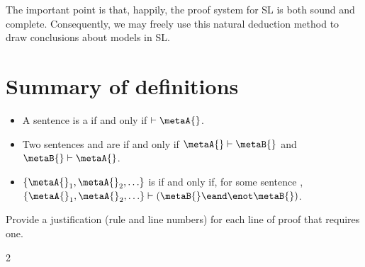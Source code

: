 The important point is that, happily, the proof system for SL is both sound and complete. Consequently, we may freely use this natural deduction method to draw conclusions about models in SL.


\section*{Summary of definitions}
\begin{itemize}
\item A sentence \metaA{} is a  if and only if $\vdash\metaA{}$.

\item Two sentences \metaA{} and \metaB{} are  if and only if $\metaA{}\vdash\metaB{}$ and $\metaB{}\vdash\metaA{}$.

\item $\{\metaA{}_1,\metaA{}_2,\ldots\}$ is  if and only if, for some sentence \metaB{}, $\{\metaA{}_1,\metaA{}_2,\ldots\}\vdash(\metaB{} \eand \enot \metaB{})$.
\end{itemize}



\practiceproblems

\solutions
\problempart
\label{pr.justifySLproof}
Provide a justification (rule and line numbers) for each line of proof that requires one.
\begin{multicols}{2}
\begin{ndproof}
 {}
 {}
\end{ndproof}

\begin{ndproof}
\open
\close
{}
\end{ndproof}

\begin{ndproof}
\open
	 {}
	\open
	\close
\close
{}
\end{ndproof}
\end{multicols}

